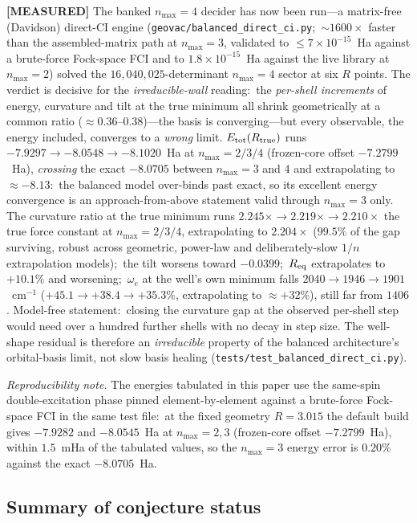 \documentclass[aps,pra,twocolumn,superscriptaddress,longbibliography]{revtex4-2}
\begin{document}
\textbf{[MEASURED]} The banked $n_{\max}=4$ decider has now been run---a
matrix-free (Davidson) direct-CI engine
(\texttt{geovac/balanced\_direct\_ci.py};\ ${\sim}1600\times$ faster than the
assembled-matrix path at $n_{\max}=3$, validated to $\le 7\times10^{-15}$~Ha
against a brute-force Fock-space FCI and to $1.8\times10^{-15}$~Ha against the
live library at $n_{\max}=2$) solved the $16{,}040{,}025$-determinant
$n_{\max}=4$ sector at six $R$ points.  The verdict is decisive for the
\emph{irreducible-wall} reading:\ the \emph{per-shell increments} of energy,
curvature and tilt at the true minimum all shrink geometrically at a common
ratio ($\approx 0.36$--$0.38$)---the basis is converging---but every
observable, the energy included, converges to a \emph{wrong} limit.
$E_{\rm tot}(R_{\rm true})$ runs $-7.9297\to-8.0548\to-8.1020$~Ha at
$n_{\max}=2/3/4$ (frozen-core offset $-7.2799$~Ha), \emph{crossing} the exact
$-8.0705$ between $n_{\max}=3$ and $4$ and extrapolating to $\approx-8.13$:\ the
balanced model over-binds
past exact, so its excellent energy convergence is an approach-from-above
statement valid through $n_{\max}=3$ only.  The curvature ratio at the true minimum runs
$2.245\times\to2.219\times\to2.210\times$ the true force constant at
$n_{\max}=2/3/4$, extrapolating to $2.204\times$ ($99.5\%$ of the gap
surviving, robust across geometric, power-law and deliberately-slow $1/n$
extrapolation models);\ the tilt worsens toward $-0.0399$;\ $R_{\rm eq}$
extrapolates to $+10.1\%$ and worsening;\ $\omega_e$ at the well's own minimum
falls $2040\to1946\to1901$~cm$^{-1}$ ($+45.1\to+38.4\to+35.3\%$, extrapolating
to $\approx+32\%$), still far from $1406$.  Model-free statement:\ closing
the curvature gap at the observed per-shell step would need over a hundred
further shells with no decay in step size.  The well-shape residual is
therefore an \emph{irreducible} property of the balanced architecture's
orbital-basis limit, not slow basis healing
(\texttt{tests/test\_balanced\_direct\_ci.py}).

\emph{Reproducibility note.}  The energies tabulated in this paper use the
same-spin double-excitation phase pinned element-by-element against a
brute-force Fock-space FCI in the same test file:\ at the fixed geometry
$R=3.015$ the default build gives $-7.9282$ and $-8.0545$~Ha at
$n_{\max}=2,3$ (frozen-core offset $-7.2799$~Ha), within $1.5$~mHa of the
tabulated values, so the $n_{\max}=3$ energy error is $0.20\%$ against the
exact $-8.0705$~Ha.

\subsection{Summary of conjecture status}
\label{sec:conjecture_verdict}
\end{document}
